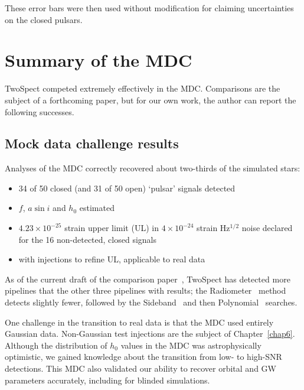 These error bars were then used without modification for claiming uncertainties on the closed pulsars.



\section{Summary of the MDC}

TwoSpect competed extremely effectively in the MDC.
Comparisons are the subject of a forthcoming paper, but for our own work, the author can report the following successes.

\subsection{Mock data challenge results}

Analyses of the MDC correctly recovered about two-thirds of the simulated stars:

\begin{itemize}
\item 34 of 50 closed (and 31 of 50 open) `pulsar' signals detected
\item $f$, $a \sin i$ and $h_0$ estimated
\item $4.23\times 10^{-25}$ strain upper limit (UL) in $4 \times 10^{-24}$ strain Hz$^{1/2}$ noise declared for the 16 non-detected, closed signals
\item with injections to refine UL, applicable to real data
\end{itemize}

\noindent As of the current draft of the comparison paper~\cite{ScoX1MDC2014DCC}, TwoSpect has detected more pipelines that the other three pipelines with results; the Radiometer~\cite{Ballmer2006CQG} method detects slightly fewer, followed by the Sideband~\cite{Messenger2007CQG} and then Polynomial~\cite{2010JPhCS.228a2005V} searches.

One challenge in the transition to real data is that the MDC used entirely Gaussian data.
Non-Gaussian test injections are the subject of Chapter~\ref{chap6}.
Although the distribution of $h_0$ values in the MDC was astrophysically optimistic, we gained knowledge about the transition from low- to high-SNR detections.
This MDC also validated our ability to recover orbital and GW parameters accurately, including for blinded simulations.

